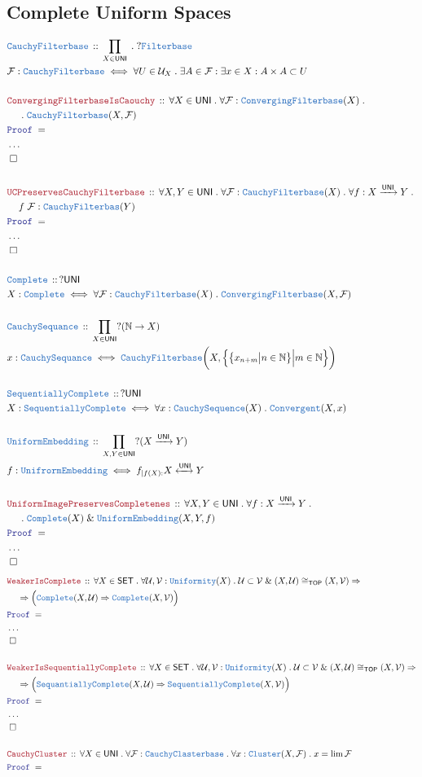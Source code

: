\documentclass[12pt]{scrartcl}
\newcommand{\TYPE}[1]{\textcolor{NavyBlue}{\mathtt{#1}}}
\newcommand{\LOGIC}[1]{\textcolor{Blue}{\mathtt{#1}}}
\newcommand{\THM}[1]{\textcolor{Maroon}{\mathtt{#1}}}
\renewcommand{\.}{\; . \;}
\newcommand{\Theorem}[2]{& \THM{#1} \, :: \, #2 \\ & \Proof = \\ }
\newcommand{\DeclareType}[2]{& \TYPE{#1} \, :: \, #2 \\}
\newcommand{\DefineType}[3]{& #1 : \TYPE{#2} \iff #3 \\}
\newcommand{\NewLine}{\\ & \kern 1pc}
\newcommand{\Page}[1]{ \begin{align*} #1 \end{align*}   }
\newcommand{\NoProof}{ & \ldots \\ \EndProof}
\renewcommand{\And}{\; \& \;}
\newcommand{\Imply}{\Rightarrow}
\newcommand{\Nat}{\mathbb{N} }
\newcommand{\ToIso}{\xleftrightarrow}
\newcommand{\Arrow}{\xrightarrow}
\newcommand{\QED}{\; \square}
\newcommand{\EndProof}{& \QED \\}
\newcommand{\Proof}{\LOGIC{Proof} \; }
\newcommand{\SET}{\mathsf{SET}}
\newcommand{\TOP}{\mathsf{TOP}}
\newcommand{\U}{\mathcal{U}}
\newcommand{\F}{\mathcal{F}}
\newcommand{\UNI}{\mathsf{UNI}}
\begin{document}
\subsection{Complete Uniform Spaces}
\Page{
	\DeclareType{CauchyFilterbase}{\prod_{X \in \UNI} \. ?\TYPE{Filterbase} }
	\DefineType{\F}{CauchyFilterbase}{\forall U \in \U_X \. \exists A \in \F : \exists x \in X : A \times A \subset U  }
	\\
	\Theorem{ConvergingFilterbaseIsCaouchy}{\forall X \in \UNI \. \forall \F : \TYPE{ConvergingFilterbase}(X) \. \NewLine \. \TYPE{CauchyFilterbase}(X,\F)}
	\NoProof
	\\
	\Theorem{UCPreservesCauchyFilterbase}{\forall X,Y \in \UNI \. \forall  \F : \TYPE{CauchyFilterbase}(X) \. \forall f : X \Arrow{\UNI} Y \. \NewLine f\; \F : \TYPE{CauchyFilterbas}(Y)  }
	\NoProof
	\\
	\DeclareType{Complete}{  ?\UNI}
	\DefineType{X}{Complete}{ \forall \F : \TYPE{CauchyFilterbase}(X) \.  \TYPE{ConvergingFilterbase}(X,\F)    }
	\\
	\DeclareType{CauchySequance}{  \prod_{X \in \UNI} ?(\Nat \to X)}
	\DefineType{x}{CauchySequance}{ \TYPE{CauchyFilterbase}\bigg( X,\Big\{  \big\{  x_{n+m} \big| n \in \Nat  \big\} \Big| m \in \Nat   \Big\} \bigg)    }
	\\
	\DeclareType{SequentiallyComplete}{  ?\UNI}
	\DefineType{X}{SequentiallyComplete}{ \forall x : \TYPE{CauchySequence}(X) \.  \TYPE{Convergent}(X,x)    }
	\\
	\DeclareType{UniformEmbedding}{\prod_{X,Y \in \UNI} ?(X \Arrow{\UNI} Y)}
	\DefineType{f}{UnifrormEmbedding}{f_{|f(X) :} X \ToIso{\UNI} Y}
	\\
	\Theorem{UniformImagePreservesCompletenes}{
		\forall X,Y \in \UNI \. 
		\forall f : X \Arrow{\UNI} Y \. \NewLine \.
		\TYPE{Complete}(X) \And \TYPE{UniformEmbedding}(X,Y,f)  
	}
	\NoProof
}\Page{
	\Theorem{WeakerIsComplete}{\forall X \in \SET \. \forall \U,\mathcal{V} : \TYPE{Uniformity}(X) \. \U \subset \mathcal{V}  \And (X,\U) \cong_{\TOP} (X,\mathcal{V}) \Imply \NewLine 
		\Imply \Big( \TYPE{Complete}(X,\U) \Imply \TYPE{Complete}(X,\mathcal{V}) \Big) }
	\NoProof
	\\
	\Theorem{WeakerIsSequentiallyComplete}{\forall X \in \SET \. \forall \U,\mathcal{V} : \TYPE{Uniformity}(X) \. \U \subset \mathcal{V} \And (X,\U) \cong_{\TOP} (X,\mathcal{V}) \Imply 
		\NewLine \Imply \Big( \TYPE{SequantiallyComplete}(X,\U) \Imply \TYPE{SequentiallyComplete}(X,\mathcal{V}) \Big) }
	\NoProof
	\\
	\Theorem{CauchyCluster}{\forall X \in \UNI \. \forall \F : \TYPE{CauchyClasterbase} \. \forall x : \TYPE{Cluster}(X,\mathcal{F}) \.  x = \lim \mathcal{F}}
}
\end{document}
